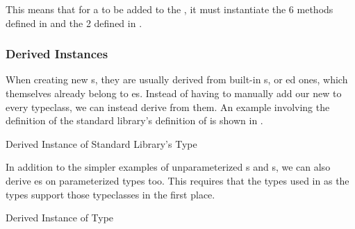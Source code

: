 This means that for a  to be added to the  , it must instantiate the 6 methods defined in  and the 2 defined in .

\subsubsection{Derived Instances}\label{subsubsec:Derived_Instances}
When creating new s, they are usually derived from built-in s, or ed ones, which themselves already belong to es.
Instead of having to manually add our new   to every typeclass, we can instead derive from them.
An example involving the definition of the standard library's definition of  is shown in .

\begin{listing}[h!tbp]
\caption{Derived Instance of Standard Library's  Type}
\label{lst:Bool_Derived_Instance}
\end{listing}

In addition to the simpler examples of unparameterized s and s, we can also derive es on parameterized types too.
This requires that the types used in as the types support those typeclasses in the first place.

\begin{listing}[h!tbp]
\caption{Derived Instance of  Type}
\label{lst:Shape_Derived_Instance}
\end{listing}


